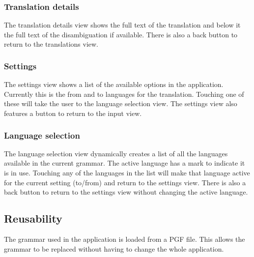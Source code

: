 \subsubsection{Translation details}
The translation details view shows the full text of the translation and below it the full text of the disambiguation if available. There is also a back button to return to the translations view.


\subsubsection{Settings}
The settings view shows a list of the available options in the application. Currently this is the from and to languages for the translation. Touching one of these will take the user to the language selection view. The settings view also features a button to return to the input view.


\subsubsection{Language selection}
The language selection view dynamically creates a list of all the languages available in the current grammar. The active language has a mark to indicate it is in use. Touching any of the languages in the list will make that language active for the current setting (to/from) and return to the settings view. There is also a back button to return to the settings view without changing the active language.


\subsection{Reusability}
The grammar used in the application is loaded from a PGF file. This allows the grammar to be replaced without having to change the whole application.
